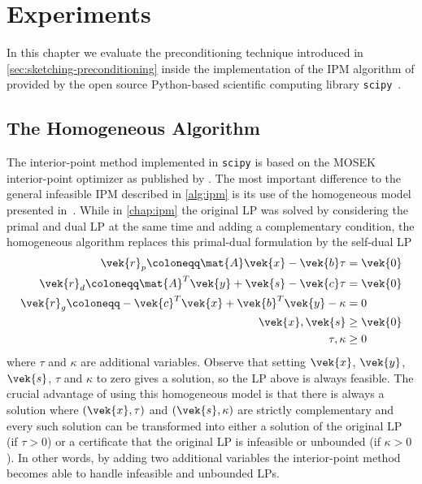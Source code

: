 \chapter{Experiments}\label{chap:experiments}

In this chapter we evaluate the preconditioning technique introduced in \cref{sec:sketching-preconditioning} inside the implementation of the IPM algorithm of \textcite{AndersenAndersen-MosekInteriorPointMethod} provided by the open source Python-based scientific computing library \texttt{scipy}~\cite{Scipy}.

\section{The Homogeneous Algorithm}\label{sec:homogeneous-algorithm}

The interior-point method implemented in \texttt{scipy} is based on the MOSEK interior-point optimizer as published by \textcite{AndersenAndersen-MosekInteriorPointMethod}.
The most important difference to the general infeasible IPM described in \cref{alg:ipm} is its use of the homogeneous model presented in~\cite{XuHungYe-SimplifiedHomogeneousAlgorithm}.
While in \cref{chap:ipm} the original LP  was solved by considering the primal and dual LP at the same time and adding a complementary condition, the homogeneous algorithm replaces this primal-dual formulation by the self-dual LP
\begin{subequations}
  \begin{align}
    \vek{r}_p \coloneqq \mat{A}\vek{x} - \vek{b} \tau &= \vek{0} \\
    \vek{r}_d \coloneqq \mat{A}^T \vek{y} + \vek{s} - \vek{c}\tau &= \vek{0} \\
    \vek{r}_g \coloneqq - \vek{c}^T\vek{x} + \vek{b}^T\vek{y} - \kappa &= 0 \\
    \vek{x}, \vek{s} &\geq \vek{0} \\
    \tau, \kappa &\geq 0
  \end{align}
\end{subequations}
where \(\tau\) and \(\kappa\) are additional variables.
Observe that setting \(\vek{x}\), \(\vek{y}\), \(\vek{s}\), \(\tau\) and \(\kappa\) to zero gives a solution, so the LP above is always feasible.
The crucial advantage of using this homogeneous model is that there is always a solution where \((\vek{x}, \tau)\) and \((\vek{s}, \kappa)\) are strictly complementary and every such solution can be transformed into either a solution of the original LP (if \(\tau > 0\)) or a certificate that the original LP is infeasible or unbounded (if \(\kappa > 0\)).
In other words, by adding two additional variables the interior-point method becomes able to handle infeasible and unbounded LPs.

